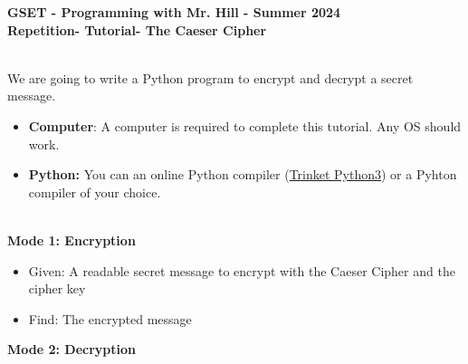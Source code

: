 \documentclass[12pt]{article}
\newcommand{\MNUM}{7} %
\newcommand{\MNAME}{Repetition} %
\newcommand{\TNAME}{The Caeser Cipher} %
\newcommand{\SEM}{Summer 2024}
\begin{document}
\thispagestyle{plain}

\begin{center}
   {\bf \large GSET - Programming with Mr. Hill - \SEM} \vspace{5mm}\\
   {\bf \Large \MNAME \hspc -  Tutorial\hspc\MNUM\hspc - \TNAME}\vspace{3mm}\\
   
\end{center}


\begin{description}[labelindent=1cm]
	
	\item[\textbf{\underline{Overview:}}] \hfill \vspace{3mm}\\
	We are going to write a Python program to encrypt and decrypt a secret message. 
	
	\item[\textbf{\underline{System Requirements:}}] \hfill \vspace{0mm}

\begin{itemize}
	\item {\bf Computer}: A computer is required to complete this tutorial. Any OS should work.
	\item {\bf Python:} You can an online Python compiler (\href{https://trinket.io/embed/python3/a5bd54189b}{Trinket Python3}) or a Pyhton compiler of your choice.
\end{itemize}

	\item[\textbf{\underline{Problem Statement:}}] \hfill \vspace{0mm} \\
	{\bf Mode 1: Encryption}
	\begin{itemize}

		\item Given: A readable secret message to encrypt with the Caeser Cipher and the cipher key
		
		\item Find: The encrypted message
		 
	\end{itemize}

	{\bf Mode 2: Decryption}
	\begin{itemize}
		

\end{itemize}
\end{description}
\end{document}
